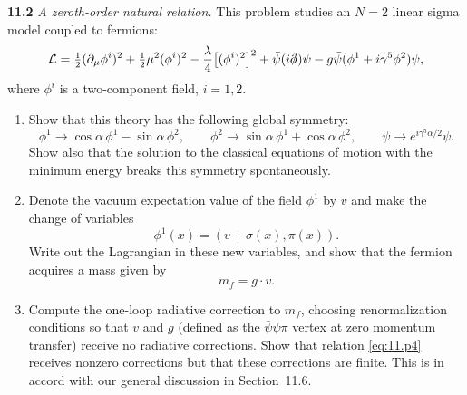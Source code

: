 \textbf{11.2} \emph{A zeroth-order natural relation.}  This problem studies an
$N = 2$ linear sigma model coupled to fermions:
\begin{equation}
  \mathcal{L} = \tfrac{1}{2}(\partial_\mu\phi^i)^2 + \tfrac{1}{2}\mu^2(\phi^i)^2
    - \frac{\lambda}{4}\bigl[ (\phi^i)^2 \bigr]^2
    + \bar{\psi}(i\slashed{\partial})\psi
    - g\bar{\psi}(\phi^1 + i\gamma^5\phi^2)\psi ,
  \label{eq:11.p1}
\end{equation}
where $\phi^i$ is a two-component field, $i = 1, 2$.
\begin{enumerate}[label=(\alph*)]
  \item Show that this theory has the following global symmetry:
    \begin{equation}
      \phi^1 \to \cos\alpha\,\phi^1 - \sin\alpha\,\phi^2,\qquad
      \phi^2 \to \sin\alpha\,\phi^1 + \cos\alpha\,\phi^2,\qquad
      \psi \to e^{i\gamma^5\alpha/2}\psi .
      \label{eq:11.p2}
    \end{equation}
    Show also that the solution to the classical equations of motion with the
    minimum energy breaks this symmetry spontaneously.
  \item Denote the vacuum expectation value of the field $\phi^1$ by $v$ and
    make the change of variables
    \begin{equation}
      \phi^1(x) = (v + \sigma(x), \pi(x)) .
      \label{eq:11.p3}
    \end{equation}
    Write out the Lagrangian in these new variables, and show that the
    fermion acquires a mass given by
    \begin{equation}
      m_f = g\cdot v .
      \label{eq:11.p4}
    \end{equation}
  \item Compute the one-loop radiative correction to $m_f$, choosing
    renormalization conditions so that $v$ and $g$ (defined as the
    $\bar{\psi}\psi\pi$ vertex at zero momentum transfer) receive no radiative
    corrections.  Show that relation \eqref{eq:11.p4} receives nonzero
    corrections but that these corrections are finite.  This is in accord
    with our general discussion in Section~11.6.
\end{enumerate}

